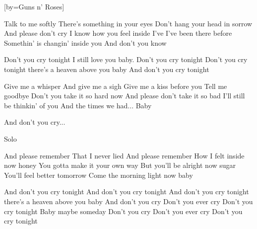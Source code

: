 
[by={Guns n' Roses}]

\chordson



\beginverse
Talk to me softly
There's something in your eyes
Don't hang your head in sorrow
And please don't cry
I know how you feel inside I've
I've been there before
Somethin' is changin' inside you
And don't you know
\endverse

\beginchorus
Don't you cry tonight I still love you baby. Don't you cry tonight
Don't you cry tonight there's a heaven above you baby
And don't you cry tonight
\endchorus




\beginverse
Give me a whisper
And give me a sigh
Give me a kiss before you
Tell me goodbye
Don't you take it so hard now
And please don't take it so bad
I'll still be thinkin' of you
And the times we had...     Baby
\endverse

\beginchorus
And don't you cry...
\endchorus

\beginchorus
Solo
\endchorus

\beginverse
And please remember
That I never lied
And please remember
How I felt inside now honey
You gotta make it your own way
But you'll be alright now sugar
You'll feel better tomorrow
Come the morning light now baby
\endverse

\beginchorus
And don't you cry tonight
And don't you cry tonight
And don't you cry tonight there's a heaven above you baby
And don't you cry
Don't you ever cry
Don't you cry tonight
Baby maybe someday
Don't you cry
Don't you ever cry
Don't you cry tonight
\endchorus


\endsong
